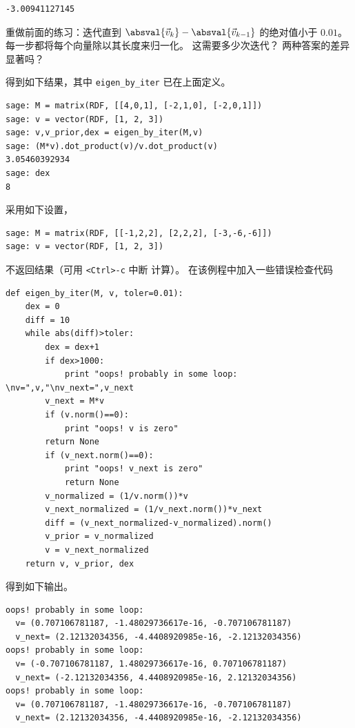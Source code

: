 \begin{exercises}
\begin{answer}
\begin{exparts}
\begin{lstlisting}
-3.00941127145
\end{lstlisting}
     \end{exparts}
    \end{answer}
  \item
     重做前面的练习：迭代直到
     $\absval{\vec{v}_k}-\absval{\vec{v}_{k-1}}$ 的绝对值小于
     $0.01$。
     每一步都将每个向量除以其长度来归一化。
     这需要多少次迭代？
     两种答案的差异显著吗？
     \begin{answer}
       \begin{exparts}
         \partsitem
           \Sage{} 得到如下结果，其中 \lstinline!eigen_by_iter!
           已在上面定义。
\begin{lstlisting}
sage: M = matrix(RDF, [[4,0,1], [-2,1,0], [-2,0,1]])
sage: v = vector(RDF, [1, 2, 3])
sage: v,v_prior,dex = eigen_by_iter(M,v)
sage: (M*v).dot_product(v)/v.dot_product(v)
3.05460392934
sage: dex
8
\end{lstlisting}
         \partsitem 采用如下设置，
\begin{lstlisting}
sage: M = matrix(RDF, [[-1,2,2], [2,2,2], [-3,-6,-6]])
sage: v = vector(RDF, [1, 2, 3])
\end{lstlisting}
            \Sage{} 不返回结果（可用 \lstinline!<Ctrl>-c! 中断
            计算）。
            在该例程中加入一些错误检查代码
\begin{lstlisting}
def eigen_by_iter(M, v, toler=0.01):
    dex = 0
    diff = 10
    while abs(diff)>toler:
        dex = dex+1
        if dex>1000:
            print "oops! probably in some loop: \nv=",v,"\nv_next=",v_next
        v_next = M*v
        if (v.norm()==0):
            print "oops! v is zero"
	    return None
        if (v_next.norm()==0):
            print "oops! v_next is zero"
            return None
        v_normalized = (1/v.norm())*v
        v_next_normalized = (1/v_next.norm())*v_next
        diff = (v_next_normalized-v_normalized).norm()
        v_prior = v_normalized
        v = v_next_normalized
    return v, v_prior, dex
\end{lstlisting}
           得到如下输出。
\begin{lstlisting}
oops! probably in some loop:
  v= (0.707106781187, -1.48029736617e-16, -0.707106781187)
  v_next= (2.12132034356, -4.4408920985e-16, -2.12132034356)
oops! probably in some loop:
  v= (-0.707106781187, 1.48029736617e-16, 0.707106781187)
  v_next= (-2.12132034356, 4.4408920985e-16, 2.12132034356)
oops! probably in some loop:
  v= (0.707106781187, -1.48029736617e-16, -0.707106781187)
  v_next= (2.12132034356, -4.4408920985e-16, -2.12132034356)

\end{lstlisting}
\end{exparts}
\end{answer}
\end{exercises}
